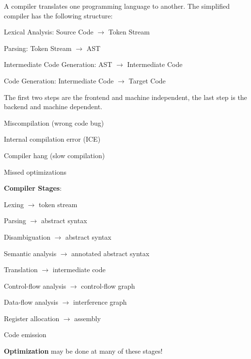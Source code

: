A compiler translates one programming language to another. The simplified compiler has the following structure:
\begin{compactitem}[$\quad\bullet$]
	\item Lexical Analysis: Source Code $\to$ Token Stream
	\item Parsing: Token Stream $\to$ AST
	\item Intermediate Code Generation: AST $\to$ Intermediate Code
	\item Code Generation: Intermediate Code $\to$ Target Code
\end{compactitem}

The first two steps are the frontend and machine independent, the last step is the backend and machine dependent.

\begin{definition}
  \begin{itemize*}
      \item Miscompilation (wrong code bug)
      \item Internal compilation error (ICE)
      \item Compiler hang (slow compilation)
      \item Missed optimizations
  \end{itemize*}
\end{definition}

\textbf{Compiler Stages}:
  \begin{compactitem}
    \item Lexing $\rightarrow$ token stream
    \item Parsing $\rightarrow$ abstract syntax
    \item Disambiguation $\rightarrow$ abstract syntax
    \item Semantic analysis $\rightarrow$ annotated abstract syntax
    \item Translation $\rightarrow$ intermediate code
    \item Control-flow analysis $\rightarrow$ control-flow graph
    \item Data-flow analysis $\rightarrow$ interference graph
    \item Register allocation $\rightarrow$ assembly
    \item Code emission
    \item \textbf{Optimization} may be done at many of these stages!
  \end{compactitem}
  
